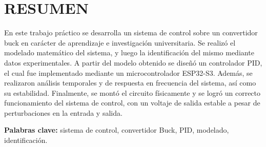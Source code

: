 \section*{\large{RESUMEN}}
\vspace{-0.35cm}
\justifying

En este trabajo práctico se desarrolla un sistema de control sobre un convertidor buck en carácter de aprendizaje e investigación universitaria.
Se realizó el modelado matemático del sistema, y luego la identificación del mismo mediante datos experimentales. A partir del modelo obtenido se 
diseñó un controlador PID, el cual fue implementado mediante un microcontrolador ESP32-S3. 
Además, se realizaron análisis temporales y de respuesta en frecuencia del sistema, así como su estabilidad. Finalmente, se montó el circuito físicamente
y se logró un correcto funcionamiento del sistema de control, con un voltaje de salida estable a pesar de perturbaciones en la entrada y salida.
\vspace{-0.15cm}

\noindent \textbf{Palabras clave:} sistema de control, convertidor Buck, PID, modelado, identificación.
